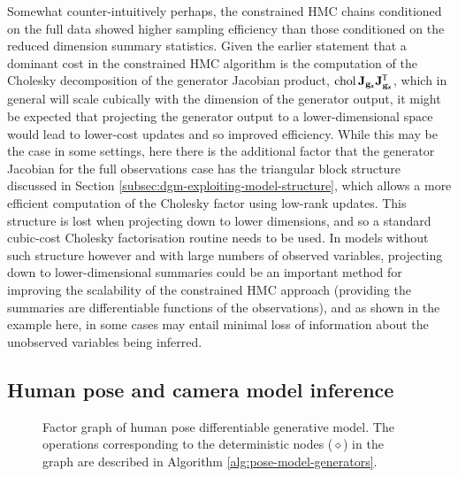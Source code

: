 Somewhat counter-intuitively perhaps, the constrained \ac{HMC} chains conditioned on the full data showed higher sampling efficiency than those conditioned on the reduced dimension summary statistics. Given the earlier statement that a dominant cost in the constrained \ac{HMC} algorithm is the computation of the Cholesky decomposition of the generator Jacobian product, $\operatorname{chol} \mathbf{J}_{{\mathbf{g}}_{\boldsymbol{\mathsf{x}}}}\mathbf{J}_{{\mathbf{g}}_{\boldsymbol{\mathsf{x}}}}^{\mkern-1.5mu\mathsf{T}}$, which in general will scale cubically with the dimension of the generator output, it might be expected that projecting the generator output to a lower-dimensional space would lead to lower-cost updates and so improved efficiency. While this may be the case in some settings, here there is the additional factor that the generator Jacobian for the full observations case has the triangular block structure discussed in Section \ref{subsec:dgm-exploiting-model-structure}, which allows a more efficient computation of the Cholesky factor using low-rank updates. This structure is lost when projecting down to lower dimensions, and so a standard cubic-cost Cholesky factorisation routine needs to be used. In models without such structure however and with large numbers of observed variables, projecting down to lower-dimensional summaries could be an important method for improving the scalability of the constrained \ac{HMC} approach (providing the summaries are differentiable functions of the observations), and as shown in the example here, in some cases may entail minimal loss of information about the unobserved variables being inferred.


\subsection{Human pose and camera model inference}

\begin{figure}
\centering
{}
\caption[Human pose generative model factor graph.]{Factor graph of human pose differentiable generative model. The operations corresponding to the deterministic nodes ($\diamond$) in the graph are described in Algorithm \ref{alg:pose-model-generators}.}
\label{fig:pose-dgm-factor-graph}
\end{figure}

